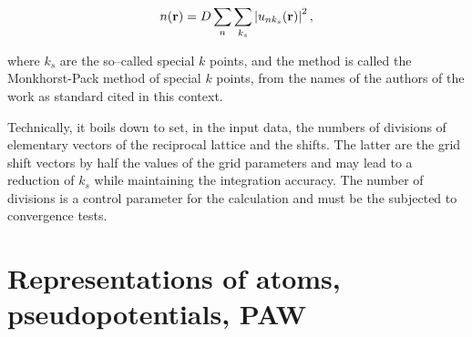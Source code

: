 \begin{equation}
    \label{Eq:density_sum_wfs_3}
    n(\mathbf{r})=D\sum_{n}\sum_{k_s}\left|u_{nk_s}(\mathbf{r})\right|^2,
\end{equation}

where $k_s$ are the so--called special $k$ points, and the method is called the Monkhorst-Pack method of special $k$ points, from the names of the authors of the work \cite{monkhorst} as standard cited in this context.

Technically, it boils down to set, in the input data, the numbers of divisions of elementary vectors of the reciprocal lattice and the shifts.
The latter are the grid shift vectors by half the values of the grid parameters and may lead to a reduction of $k_s$ while maintaining the integration accuracy.
The number of divisions is a control parameter for the calculation and must be the subjected to convergence tests.

\ornament

\section{Representations of atoms, pseudopotentials, PAW}

